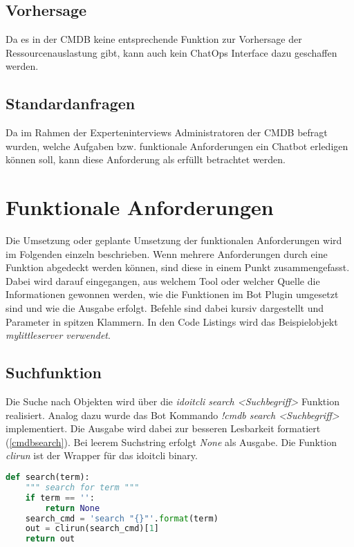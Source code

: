 \subsection{Vorhersage}
 Da es in der \acs{CMDB} keine entsprechende Funktion zur Vorhersage der Ressourcenauslastung gibt, kann auch kein ChatOps Interface dazu geschaffen werden.


\subsection{Standardanfragen}
Da im Rahmen der Experteninterviews Administratoren der \acs{CMDB} befragt wurden, welche Aufgaben bzw. funktionale Anforderungen ein Chatbot erledigen können soll, kann diese Anforderung als erfüllt betrachtet werden. 



\section{Funktionale Anforderungen}
Die Umsetzung oder geplante Umsetzung der funktionalen Anforderungen wird im Folgenden einzeln beschrieben. Wenn mehrere Anforderungen durch eine Funktion abgedeckt werden können, sind diese in einem Punkt zusammengefasst. Dabei wird darauf eingegangen, aus welchem Tool oder welcher Quelle die Informationen gewonnen werden, wie die Funktionen im Bot Plugin umgesetzt sind und wie die Ausgabe erfolgt. Befehle sind dabei kursiv dargestellt und Parameter in spitzen Klammern. In den Code Listings wird das Beispielobjekt \textit{mylittleserver verwendet}.

\subsection{Suchfunktion}
Die Suche nach Objekten wird über die \textit{idoitcli search <Suchbegriff>} Funktion realisiert. Analog dazu wurde das Bot Kommando \textit{!cmdb search <Suchbegriff>} implementiert. Die Ausgabe wird dabei zur besseren Lesbarkeit formatiert (\autoref{cmdbsearch}). Bei leerem Suchstring erfolgt \textit{None} als Ausgabe. Die Funktion \textit{clirun} ist der Wrapper für das idoitcli binary.

\newpage
\begin{lstlisting}[language=python, label=cmdbsearch, caption=Suchfunktion]
def search(term):
    """ search for term """
    if term == '':
        return None
    search_cmd = 'search "{}"'.format(term)
    out = clirun(search_cmd)[1]
    return out
\end{lstlisting}


